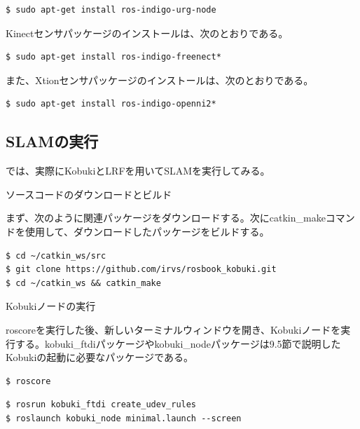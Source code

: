 \begin{lstlisting}[language=ROS]
$ sudo apt-get install ros-indigo-urg-node
\end{lstlisting}

Kinectセンサパッケージのインストールは、次のとおりである。

\begin{lstlisting}[language=ROS]
$ sudo apt-get install ros-indigo-freenect*
\end{lstlisting}

また、Xtionセンサパッケージのインストールは、次のとおりである。

\begin{lstlisting}[language=ROS]
$ sudo apt-get install ros-indigo-openni2*
\end{lstlisting}

\subsection{SLAMの実行}

では、実際にKobukiとLRFを用いてSLAMを実行してみる。

\setcounter{num}{0}

\circled{\thenum} ソースコードのダウンロードとビルド

まず、次のように関連パッケージをダウンロードする。次にcatkin\_makeコマンドを使用して、ダウンロードしたパッケージをビルドする。

\begin{lstlisting}[language=ROS]
$ cd ~/catkin_ws/src
$ git clone https://github.com/irvs/rosbook_kobuki.git
$ cd ~/catkin_ws && catkin_make
\end{lstlisting}

\circled{\thenum} Kobukiノードの実行

roscoreを実行した後、新しいターミナルウィンドウを開き、Kobukiノードを実行する。kobuki\_ftdiパッケージやkobuki\_nodeパッケージは9.5節で説明したKobukiの起動に必要なパッケージである。

\begin{lstlisting}[language=ROS]
$ roscore
\end{lstlisting}

\begin{lstlisting}[language=ROS]
$ rosrun kobuki_ftdi create_udev_rules
$ roslaunch kobuki_node minimal.launch --screen
\end{lstlisting}

